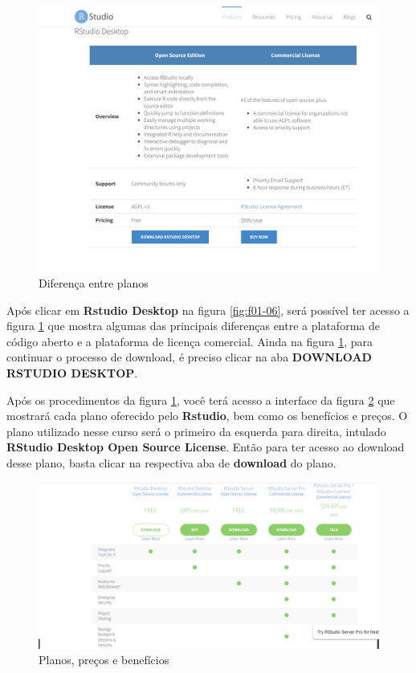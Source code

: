 \documentclass[12pt,a4paper,oneside]{erdc}
\begin{document}
\begin{figure}[htpb!]
	\centering
	\includegraphics[width=\linewidth]{../figs/BP_Curso_TecComp_00_2019_f01-07}
	\caption{Diferença entre planos}
	\label{fig:f01-07}
\end{figure}

Após clicar em \textbf{Rstudio Desktop} na figura \ref{fig:f01-06}, será possível ter acesso a figura \ref{fig:f01-07} que mostra algumas das principais diferenças entre a plataforma de código aberto e a plataforma de licença comercial. Ainda na figura \ref{fig:f01-07}, para continuar o processo de download, é preciso clicar na aba \textbf{DOWNLOAD RSTUDIO DESKTOP}. 

Após os procedimentos da figura \ref{fig:f01-07}, você terá acesso a interface da figura \ref{fig:f01-08} que mostrará cada plano oferecido pelo \textbf{Rstudio}, bem como os benefícios e preços. O plano utilizado nesse curso será o primeiro da esquerda para direita, intulado \textbf{RStudio Desktop Open Source License}. Então para ter acesso ao download desse plano, basta clicar na respectiva aba de \textbf{download} do plano.

\begin{figure}[htpb!]
	\centering
	\includegraphics[width=\linewidth]{../figs/BP_Curso_TecComp_00_2019_f01-08}
	\caption{Planos, preços e benefícios}
	\label{fig:f01-08}
\end{figure}
\end{document}
